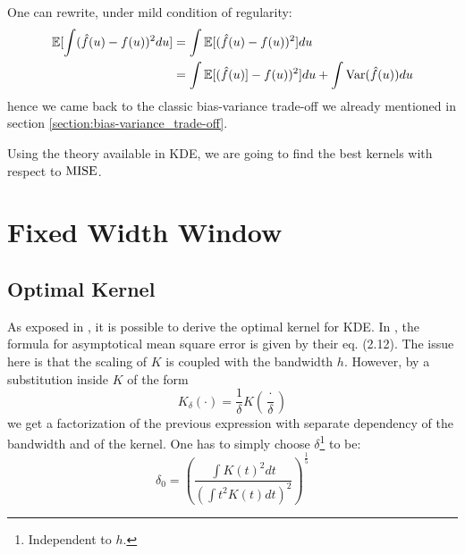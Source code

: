 \documentclass[11pt]{book}
\begin{document}
\begin{remarque}
One can rewrite, under mild condition of regularity:
\begin{align*}
\mathbb E [ \int ( \hat{f}(u) - f(u) )^2 du ] &= \int \mathbb E [( \hat{f}(u) - f(u) )^2 ] du \\
&= \int  \mathbb E[ (\hat{f}(u) ] - f(u) )^2 ] du + \int \mathrm{Var}( \hat{f}(u)) du 
\end{align*}
hence we came back to the classic bias-variance trade-off we already mentioned in section \ref{section:bias-variance_trade-off}.
\end{remarque}

Using the theory available in KDE, we are going to find the best kernels with respect to $\operatorname{MISE}$.

\section{Fixed Width Window}
\label{section:FWW}
\subsection{Optimal Kernel}

As exposed in \cite{Wand}, it is possible to derive the optimal kernel for KDE. In \cite{Wand}, the formula for asymptotical mean square error is given by their eq. (2.12). The issue here is that the scaling of $K$ is coupled with the bandwidth $h$. However, by a substitution inside $K$ of the form 
$$ K_{\delta} ( \cdot ) = \frac 1  {\delta } K \left ( \frac {\cdot } { \delta } \right ) $$
we get a factorization of the previous expression with separate dependency of the bandwidth and of the kernel. One has to simply choose $\delta$\footnote{Independent to $h$.} to be: $$ \delta_0 = \left ( \frac{ \int K(t)^2 dt }{ \left ( \int t^2 K(t) dt \right )^2 } \right ) ^{\frac 1 5} $$
\end{document}
